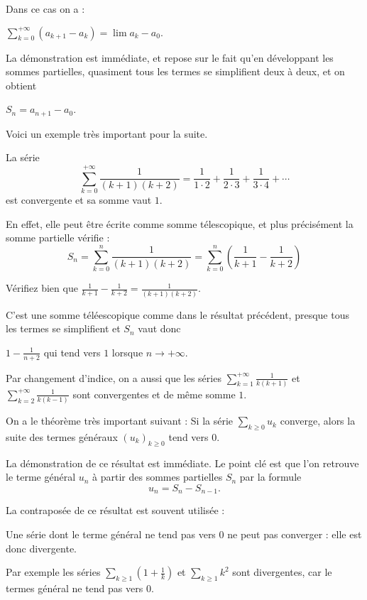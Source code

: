 \change
Dans ce cas on a :

$\displaystyle\sum_{k=0}^{+\infty} (a_{k+1}-a_k) = \lim a_k - a_0.$

\change
La démonstration est immédiate, et repose sur le fait qu'en développant les sommes partielles, quasiment tous les termes se simplifient deux à deux, et on obtient

$S_n=a_{n+1}-a_0 $.


\diapo

Voici un exemple très important pour la suite.

La série $$\sum_{k=0}^{+\infty} \frac{1}{(k+1)(k+2)}=\frac{1}{1\cdot 2}+\frac{1}{2\cdot 3}+
 \frac{1}{3\cdot 4}+\cdots$$
est convergente et sa somme vaut $1$. 

\change
En effet, elle peut être écrite comme somme télescopique, et plus précisément la somme partielle vérifie :
$$S_n=\sum_{k=0}^n \frac{1}{(k+1)(k+2)}= \sum_{k=0}^n \left(\frac{1}{k+1}-\frac{1}{k+2}\right)$$

Vérifiez bien que $\frac{1}{k+1}-\frac{1}{k+2} = \frac{1}{(k+1)(k+2)}$.

\change
C'est une somme téléescopique comme dans le résultat précédent, 
presque tous les termes se simplifient et $S_n$ vaut donc

$1- \frac{1}{n+2}$
qui tend vers $1$ lorsque $n\to+\infty$.

\change
Par changement d'indice, on a aussi que les séries 
$\sum_{k=1}^{+\infty} \frac{1}{k(k+1)}$ et 
$\sum_{k=2}^{+\infty} \frac{1}{k(k-1)}$ sont convergentes et de même somme $1$.


\diapo

On a le théorème très important suivant :
Si la série $\sum_{k\ge0} u_k$ converge, 
alors la suite des termes généraux $(u_k)_{k \ge 0}$ tend vers $0$.

\change
La démonstration de ce résultat est immédiate.  Le point clé est que l'on retrouve le terme général $u_n$ à partir des sommes partielles $S_n$ par la formule
$$u_n = S_n - S_{n-1}.$$

\change
La contraposée de ce résultat est souvent utilisée : 

Une série dont le terme général ne tend pas vers $0$ ne peut pas
converger : elle est donc divergente.

\change
Par exemple les séries $\sum_{k \ge 1} (1+\frac{1}{k})$ et $\sum_{k \ge 1} k^2$ sont 
divergentes, car le termes général ne tend pas vers $0$.

